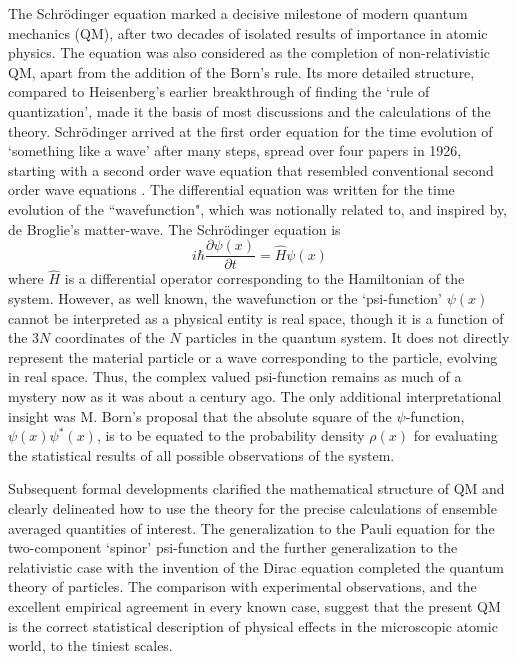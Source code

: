 The Schr\"{o}dinger equation marked a decisive milestone of modern quantum mechanics
(QM), after two decades of isolated results of importance in atomic physics. The equation
was also considered as the completion of non-relativistic QM, apart from the addition of the
Born's rule. Its more detailed structure, compared to Heisenberg's earlier breakthrough of
finding the `rule of quantization', made it the basis of most discussions and the calculations
of the theory. Schr\"{o}dinger arrived at the first order equation for the time evolution of
`something like a wave' after many steps, spread over four papers in 1926, starting with a
second order wave equation that resembled conventional second order wave equations \cite{chap14-key1}.
The differential equation was written for the time evolution of the ``wavefunction", which was
notionally related to, and inspired by, de Broglie's matter-wave. The Schr\"{o}dinger equation
is
\begin{equation*}
i \hbar \frac{\partial \psi (x)}{\partial t} = \hat{H} \psi (x) \tag{1}\label{c14-eq1}
\end{equation*}
where $\hat{H}$ is a differential operator corresponding to the Hamiltonian of the system. However,
as well known, the wavefunction or the `psi-function' $\psi (x)$ cannot be interpreted as a physical
entity is real space, though it is a function of the $3N$ coordinates of the $N$ particles in the
quantum system. It does not directly represent the material particle or a wave corresponding
to the particle, evolving in real space. Thus, the complex valued psi-function remains as
much of a mystery now as it was about a century ago. The only additional interpretational
insight was M. Born's proposal that the absolute square of the $\psi$-function, $\psi(x) \psi^{\ast}(x)$, is to
be equated to the probability density $\rho(x)$ for evaluating the statistical results of all possible
observations of the system.

Subsequent formal developments clarified the mathematical structure of QM and clearly
delineated how to use the theory for the precise calculations of ensemble averaged quantities
of interest. The generalization to the Pauli equation for the two-component `spinor' psi-function and the further generalization to the relativistic case with the invention of the Dirac
equation completed the quantum theory of particles. The comparison with experimental
observations, and the excellent empirical agreement in every known case, suggest that the
present QM is the correct statistical description of physical effects in the microscopic atomic
world, to the tiniest scales.

